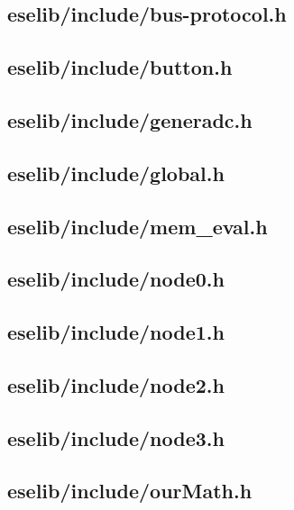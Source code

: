 \documentclass[12pt,a4paper,titlepage,oneside]{article}
\begin{document}
\subsection{eselib/include/bus-protocol.h}

\newpage
\subsection{eselib/include/button.h}

\newpage
\subsection{eselib/include/generadc.h}

\newpage
\subsection{eselib/include/global.h}

\newpage
\subsection{eselib/include/mem\_eval.h}

\newpage
\subsection{eselib/include/node0.h}

\newpage
\subsection{eselib/include/node1.h}

\newpage
\subsection{eselib/include/node2.h}

\newpage
\subsection{eselib/include/node3.h}

\newpage
\subsection{eselib/include/ourMath.h}

\newpage
\end{document}
